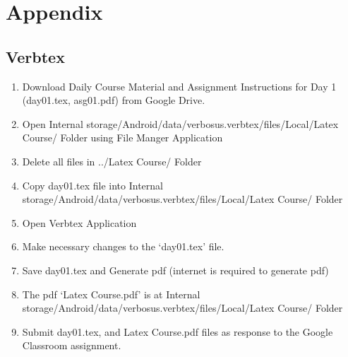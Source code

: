 \documentclass{article}
\begin{document}
\pagebreak
\section{Appendix}
\subsection{Verbtex}
\begin{enumerate}
	\item Download Daily Course Material and Assignment Instructions for Day 1 (day01.tex, asg01.pdf) from Google Drive.
	\item Open Internal storage/Android/data/verbosus.verbtex/files/Local/Latex Course/ Folder using File Manger Application
	\item Delete all files in ../Latex Course/ Folder
	\item Copy day01.tex file into Internal storage/Android/data/verbosus.verbtex/files/Local/Latex Course/  Folder
	\item Open Verbtex Application
	\item Make necessary changes to the `day01.tex' file.
	\item Save day01.tex and Generate pdf (internet is required to generate pdf)
	\item The pdf `Latex Course.pdf' is at Internal storage/Android/data/verbosus.verbtex/files/Local/Latex Course/  Folder
	\item Submit day01.tex, and Latex Course.pdf files as response to the Google Classroom assignment.
\end{enumerate}
\end{document}
